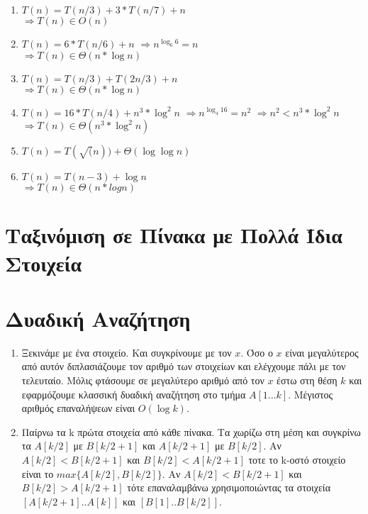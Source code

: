 \documentclass[a4paper,10pt]{article} \usepackage{anysize}
\begin{document}
\begin{enumerate}
\begin{enumerate}
\item $T(n) = T(n/3) +3*T(n/7)+n$\\
$\Rightarrow T(n) \in O(n)$

\item $T(n) = 6*T(n/6)+n$
$\Rightarrow n^{\log _6 {6}} = n$\\
$\Rightarrow T(n) \in \Theta(n*\log {n})$

\item $T(n) = T(n/3) + T(2n/3) + n$\\
$\Rightarrow T(n) \in \Theta(n*\log{n})$

\item $T(n) = 16*T(n/4) + n^3*\log^2{n}$
$\Rightarrow n^{\log _4{16}} = n^2$
$\Rightarrow n^2 < n^3*\log^2{n}$\\
$\Rightarrow T(n) \in \Theta(n^3*\log^2{n})$

\item $T(n) = T(\sqrt(n)) + \Theta(\log{\log{n}})$

\item $T(n) = T(n-3) + \log{n}$\\
$\Rightarrow T(n) \in \Theta(n*logn)$

\end{enumerate}
\end{enumerate}

\section{Ταξινόμιση σε Πίνακα με Πολλά Ίδια Στοιχεία}

\section{Δυαδική Αναζήτηση}
\begin{enumerate}
\item Ξεκινάμε με ένα στοιχείο. Και συγκρίνουμε με τον $x$. Όσο ο $x$ είναι
μεγαλύτερος από αυτόν διπλασιάζουμε τον αριθμό των στοιχείων και ελέγχουμε
πάλι με τον τελευταίο. Μόλις φτάσουμε σε μεγαλύτερο αριθμό από τον $x$ έστω
στη θέση $k$ και εφαρμόζουμε κλασσική δυαδική αναζήτηση στο τμήμα $A[1...k]$. 
Μέγιστος αριθμός επαναλήψεων είναι $O(\log{k})$.
\item Παίρνω τα k πρώτα στοιχεία από κάθε πίνακα. Τα χωρίζω στη μέση και
συγκρίνω τα $A[k/2]$ με $B[k/2+1]$ και $A[k/2+1]$ με $B[k/2]$. Αν
$A[k/2]<B[k/2+1]$ και $B[k/2]<A[k/2+1]$ τοτε το k-οστό στοιχείο είναι το
$max\{A[k/2],B[k/2]\}$. Αν $A[k/2]<B[k/2+1]$ και $B[k/2]>A[k/2+1]$ τότε
επαναλαμβάνω χρησιμοποιώντας τα στοιχεία $[A[k/2+1]..A[k]]$ και
$[B[1]..B[k/2]]$.
\end{enumerate}
\end{document}
